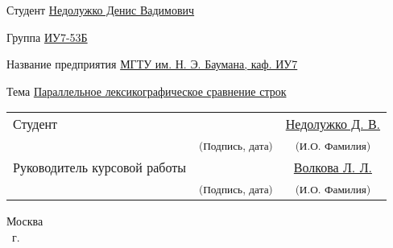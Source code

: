 \begin{titlepage}
    \begin{flushleft}
        Студент \uline{\hfill Недолужко Денис Вадимович \hfill}
        
        Группа \uline{\hfill ИУ7-53Б \hfill}
        
        Название предприятия \uline{\hfill МГТУ им. Н. Э. Баумана, каф. ИУ7  \hfill}
        
        Тема \uline{\hfill Параллельное лексикографическое сравнение строк \hfill}
    \end{flushleft}
    
    \vfill
    
    \begin{flushleft}
    \begin{tabularx}{\textwidth}{Xcc}
      Студент& \uline{\hfill} &  \hfill\uline{Недолужко Д. В.}\\
      &\textsuperscript{\scriptsize{(Подпись, дата)}}&\textsuperscript{\scriptsize{(И.О. Фамилия)}}\\
      Руководитель курсовой работы & \uline{\hfill} & \uline{Волкова Л. Л.}\\
      &\textsuperscript{\scriptsize{(Подпись, дата)}}&\textsuperscript{\scriptsize{(И.О. Фамилия)}}\\
    \end{tabularx}
    \end{flushleft}
    
    \vfill
    
    \begin{center}
        \normalsize Москва \\
        \the\year ~г.
    \end{center}
\end{titlepage}